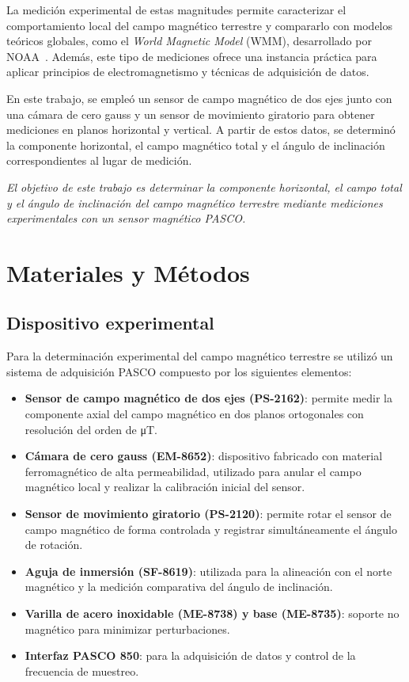 \documentclass[12pt,a4paper]{article}
\begin{document}
La medición experimental de estas magnitudes permite caracterizar el comportamiento local del campo magnético terrestre y compararlo con modelos teóricos globales, como el \textit{World Magnetic Model} (WMM), desarrollado por NOAA~\cite{geomag}. Además, este tipo de mediciones ofrece una instancia práctica para aplicar principios de electromagnetismo y técnicas de adquisición de datos.

En este trabajo, se empleó un sensor de campo magnético de dos ejes junto con una cámara de cero gauss y un sensor de movimiento giratorio para obtener mediciones en planos horizontal y vertical. A partir de estos datos, se determinó la componente horizontal, el campo magnético total y el ángulo de inclinación correspondientes al lugar de medición.

\textit{El objetivo de este trabajo es determinar la componente horizontal, el campo total y el ángulo de inclinación del campo magnético terrestre mediante mediciones experimentales con un sensor magnético PASCO.}


\section{Materiales y Métodos}

\subsection{Dispositivo experimental}

Para la determinación experimental del campo magnético terrestre se utilizó un sistema de adquisición PASCO compuesto por los siguientes elementos:

\begin{itemize}
    \item \textbf{Sensor de campo magnético de dos ejes (PS-2162)}: permite medir la componente axial del campo magnético en dos planos ortogonales con resolución del orden de \si{\micro\tesla}.
    \item \textbf{Cámara de cero gauss (EM-8652)}: dispositivo fabricado con material ferromagnético de alta permeabilidad, utilizado para anular el campo magnético local y realizar la calibración inicial del sensor.
    \item \textbf{Sensor de movimiento giratorio (PS-2120)}: permite rotar el sensor de campo magnético de forma controlada y registrar simultáneamente el ángulo de rotación.
    \item \textbf{Aguja de inmersión (SF-8619)}: utilizada para la alineación con el norte magnético y la medición comparativa del ángulo de inclinación.
    \item \textbf{Varilla de acero inoxidable (ME-8738) y base (ME-8735)}: soporte no magnético para minimizar perturbaciones.
    \item \textbf{Interfaz PASCO 850}: para la adquisición de datos y control de la frecuencia de muestreo.
\end{itemize}
\end{document}
